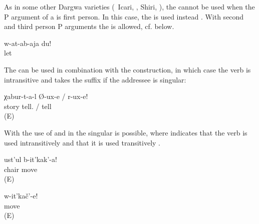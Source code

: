As in some other Dargwa varieties (\teg\ Icari, \citealp[98]{Sumbatova.Mutalov2003}, Shiri, \citealp{BelyaevInPreparation}), the  cannot be used when the P argument of a  is first person. In this case, the  is used instead . With second and third person P arguments the  is allowed, cf.  below.
%
\begin{exe}
	\ex	\label{ex:Leave me}
	\gll	w-at-ab-aja	du!\\
		let	\\
	\glt	{}
\end{exe}

The  can be used in combination with the  construction, in which case the verb is intransitive and takes the suffix  if the addressee is singular: 
%
\begin{exe}
	\ex	\label{ex:Tell stories}
	\gll	χabur-t-a-l	Ø-ux-e	/	r-ux-e!\\
		story	tell.	/	tell\\
	\glt	{} (E)
\end{exe}

With  the use of  and  in the  singular is possible, where  indicates that the verb is used intransitively and  that it is used transitively .

\begin{exe}

		\ex	\label{ex:Move the chair}
		\gll	ust'ul	b-it'kak'-a!\\
			chair	move\\
		\glt	{} (E)
	
		\ex	\label{ex:Move (yourself)}
		\gll	w-it'kač'-e!\\
			move\\
		\glt	{} (E)

\end{exe}

